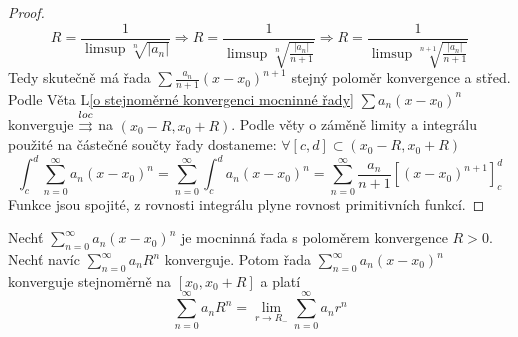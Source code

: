 \begin{proof}
$$R = \frac{1}{\limsup \sqrt[n]{|a_n|}} \Rightarrow R = \frac{1}{\limsup \sqrt[n]{ \frac{|a_n|}{n+1}}} \Rightarrow R = \frac{1}{\limsup \sqrt[n+1]{ \frac {|a_n|}{n+1}}}$$
Tedy skutečně má řada $\sum \frac{a_n}{n+1}(x-x_0)^{n+1}$ stejný poloměr konvergence a střed.
Podle Věta L\ref{o stejnoměrné konvergenci mocninné řady} $\sum a_n (x-x_0)^n $ konverguje $\overset{loc}{\rightrightarrows}$ na $(x_0-R, x_0+R)$.
Podle věty o záměně limity a integrálu použité na částečné součty řady dostaneme: $\forall [c,d] \subset (x_0-R,x_0+R) $
$$\int_c^d \sum_{n=0}^\infty a_n(x-x_0)^n = \sum_{n=0}^\infty \int_c^d a_n(x-x_0)^n = \sum_{n=0}^\infty \frac{a_n}{n+1} \left[ (x-x_0)^{n+1} \right]_c^d $$
Funkce jsou spojité, z rovnosti integrálu plyne rovnost primitivních funkcí.
\end{proof}

\begin{vetat}[Abelova]
Nechť $\sum_{n=0}^{\infty} a_n (x-x_0)^n$ je mocninná řada s poloměrem konvergence $R > 0$. Nechť navíc $\sum_{n=0}^{\infty} a_n R^n$ konverguje. Potom řada $\sum_{n=0}^{\infty} a_n (x-x_0)^n$ konverguje stejnoměrně na $[ x_0, x_0 + R ]$ a platí
$$\sum_{n=0}^{\infty} a_n R^n = \lim_{r \rightarrow R_-} \sum_{n=0}^{\infty} a_n r^n$$
\end{vetat}

